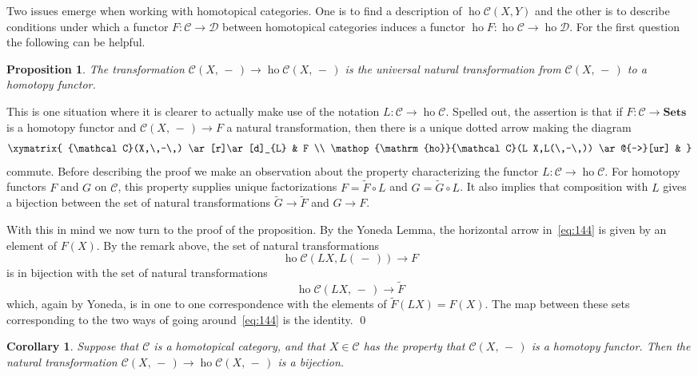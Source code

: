 \documentclass{amsart}
\newtheorem{cor}[equation]{Corollary}
\newtheorem{prop}[equation]{Proposition}
\theoremstyle{definition}
\theoremstyle{remark}
\newenvironment{pf}{\bigskip{\em Proof:\/}}{\qed\medskip}
\newcommand{\slot}{\,-\,}
\DeclareMathOperator{\ho}{ho}
\newcommand{\cat}[1]{{\mathcal #1}}
\newcommand{\sets}{\mathbf{Sets}}
\begin{document}
Two issues emerge when working with homotopical categories.  One is to
find a description of $\ho\cat C(X,Y)$ and the other is to describe
conditions under which a functor $F:\cat C\to \cat D$ between
homotopical categories induces a functor $\ho F:\ho\cat C\to \ho\cat
D$.  For the first question the following can be helpful.

\begin{prop}
\label{thm-copied:99} The transformation $\cat
C(X,\slot)\to \ho\cat C(X,\slot)$ is the universal natural
transformation from $\cat C(X,\slot)$ to a homotopy functor.
\end{prop}

\begin{pf}
This is one situation where it is clearer to actually make use of the
notation $L:\cat C\to\ho\cat C$.  Spelled out, the assertion is that
if $F:\cat C\to\sets $ is a homotopy functor and $\cat C(X,\slot)\to
F$ a natural transformation, then there is a unique dotted arrow
making the diagram
\begin{equation}
\label{eq:144}
\xymatrix{
\cat C(X,\slot)  \ar[r]\ar[d]_{L}  & F \\
\ho\cat C(L X,L(\slot))  \ar@{-->}[ur]        & 
}
\end{equation}
commute.  Before describing the proof we make an observation about the
property characterizing the functor $L:\cat C\to \ho\cat C$.  For
homotopy functors $F$ and $G$ on $\cat C$, this property supplies unique
factorizations $F=\tilde F\circ L$ and $G=\tilde G\circ L$.  It also
implies that composition with $L$ gives a bijection between the set of
natural transformations $\tilde G\to \tilde F$ and $G\to F$.

With this in mind we now turn to the proof of the proposition.  By the
Yoneda Lemma, the horizontal arrow in~\eqref{eq:144} is given by an
element of $F(X)$.  By the remark above, the set of natural
transformations
\[
\ho\cat C(L X, L(\slot) ) \to F
\]
is in bijection with the set of natural transformations 
\[
\ho\cat C(L X,\slot)\to \tilde F
\]
which, again by Yoneda, is in one to one correspondence with the
elements of $\tilde F(LX)=F(X)$.  The map between these sets
corresponding to the two ways of going around~\eqref{eq:144} is the
identity.
\end{pf}

\begin{cor}
\label{thm:129} 
Suppose that $\cat C$ is a homotopical category, and
that $X\in\cat C$ has the property that $\cat C(X,\slot)$ is a
homotopy functor.  Then the natural transformation $\cat C(X,\slot)\to
\ho\cat C(X,\slot)$ is a bijection.
\end{cor}
\end{document}
